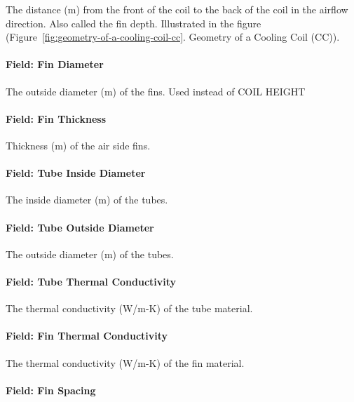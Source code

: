 The distance (m) from the front of the coil to the back of the coil in the airflow direction. Also called the fin depth. Illustrated in the figure (Figure~\ref{fig:geometry-of-a-cooling-coil-cc}. Geometry of a Cooling Coil (CC)).

\paragraph{Field: Fin Diameter}\label{field-fin-diameter}

The outside diameter (m) of the fins. Used instead of COIL HEIGHT

\paragraph{Field: Fin Thickness}\label{field-fin-thickness}

Thickness (m) of the air side fins.

\paragraph{Field: Tube Inside Diameter}\label{field-tube-inside-diameter}

The inside diameter (m) of the tubes.

\paragraph{Field: Tube Outside Diameter}\label{field-tube-outside-diameter}

The outside diameter (m) of the tubes.

\paragraph{Field: Tube Thermal Conductivity}\label{field-tube-thermal-conductivity}

The thermal conductivity (W/m-K) of the tube material.

\paragraph{Field: Fin Thermal Conductivity}\label{field-fin-thermal-conductivity}

The thermal conductivity (W/m-K) of the fin material.

\paragraph{Field: Fin Spacing}\label{field-fin-spacing}

